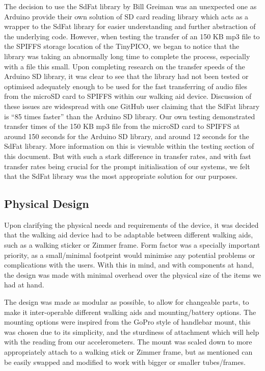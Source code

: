             The decision to use the SdFat library by Bill Greiman \cite{greiman} was an unexpected one as Arduino provide their own solution of SD card reading library \cite{arduino} which acts as a wrapper to the SdFat library for easier understanding and further abstraction of the underlying code. However, when testing the transfer of an 150 KB mp3 file to the SPIFFS storage location of the TinyPICO, we began to notice that the library was taking an abnormally long time to complete the process, especially with a file this small. Upon completing research on the transfer speeds of the Arduino SD library, it was clear to see that the library had not been tested or optimised adequately enough to be used for the fast transferring of audio files from the microSD card to SPIFFS within our walking aid device. Discussion of these issues are widespread \cite{fat16lib_2011,drdooom_2019} with one GitHub user claiming that the SdFat library is ``85 times faster'' \cite{kas2_2018} than the Arduino SD library. Our own testing demonstrated transfer times of the 150 KB mp3 file from the microSD card to SPIFFS at around 150 seconds for the Arduino SD library, and around 12 seconds for the SdFat library. More information on this is viewable within the testing section of this document. But with such a stark difference in transfer rates, and with fast transfer rates being crucial for the prompt initialisation of our systems, we felt that the SdFat library was the most appropriate solution for our purposes.

        \subsection{Physical Design}
        \label{subsec:Design_Decisions_walking_aid}

            Upon clarifying the physical needs and requirements of the device, it was decided that the walking aid device had to be adaptable between different walking aids, such as a walking sticker or Zimmer frame. Form factor was a specially important priority, as a small/minimal footprint would minimise any potential problems or complications with the users. With this in mind, and with components at hand, the design was made with minimal overhead over the physical size of the items we had at hand. 

            

            The design was made as modular as possible, to allow for changeable parts, to make it inter-operable different walking aids and mounting/battery options. The mounting options were inspired from the GoPro style of handlebar mount, this was chosen due to its simplicity, and the sturdiness of attachment which will help with the reading from our accelerometers. The mount was scaled down to more appropriately attach to a walking stick or Zimmer frame, but as mentioned can be easily swapped and modified to work with bigger or smaller tubes/frames.

